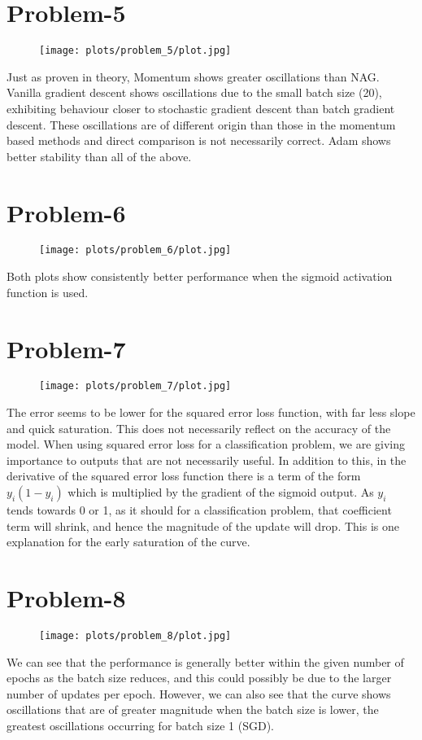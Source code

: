 \documentclass[addpoints,12pt]{exam}
\begin{document}
\section*{Problem-5}
\begin{figure}[h]
\texttt{[image: plots/problem\_5/plot.jpg]}
\centering
\end{figure}
Just as proven in theory, Momentum shows greater oscillations than NAG. Vanilla gradient descent shows oscillations due to the small batch size (20), exhibiting behaviour closer to stochastic gradient descent than batch gradient descent. These oscillations are of different origin than those in the momentum based methods and direct comparison is not necessarily correct. Adam shows better stability than all of the above.
\newpage

\section*{Problem-6}
\begin{figure}[h]
\texttt{[image: plots/problem\_6/plot.jpg]}
\centering
\end{figure}
Both plots show consistently better performance when the sigmoid activation function is used.
\newpage

\section*{Problem-7}
\begin{figure}[h]
\texttt{[image: plots/problem\_7/plot.jpg]}
\centering
\end{figure}
The error seems to be lower for the squared error loss function, with far less slope and quick saturation. This does not necessarily reflect on the accuracy of the model. When using squared error loss for a classification problem, we are giving importance to outputs that are not necessarily useful. In addition to this, in the derivative of the squared error loss function there is a term of the form $y_i(1-y_i)$ which is multiplied by the gradient of the sigmoid output. As $y_i$ tends towards 0 or 1, as it should for a classification problem, that coefficient term will shrink, and hence the magnitude of the update will drop. This is one explanation for the early saturation of the curve.
\newpage

\section*{Problem-8}
\begin{figure}[h]
\texttt{[image: plots/problem\_8/plot.jpg]}
\centering
\end{figure}
We can see that the performance is generally better within the given number of epochs as the batch size reduces, and this could possibly be due to the larger number of updates per epoch. However, we can also see that the curve shows oscillations that are of greater magnitude when the batch size is lower, the greatest oscillations occurring for batch size 1 (SGD).
\end{document}
